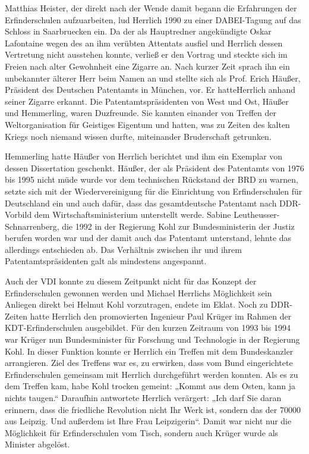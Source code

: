 \documentclass[11pt,a4paper]{article}
\begin{document}
Matthias Heister, der direkt nach der Wende damit begann die Erfahrungen der
Erfinderschulen aufzuarbeiten, lud Herrlich 1990 zu einer DABEI-Tagung auf das
Schloss in Saarbruecken ein. Da der als Hauptredner angekündigte Oskar
Lafontaine wegen des an ihm verübten Attentats ausfiel und Herrlich dessen
Vertretung nicht ausstehen konnte, verließ er den Vortrag und steckte sich im
Freien nach alter Gewohnheit eine Zigarre an.  Nach kurzer Zeit sprach ihn ein
unbekannter älterer Herr beim Namen an und stellte sich als Prof. Erich
Häußer, Präsident des Deutschen Patentamts in München, vor. Er hatteHerrlich
anhand seiner Zigarre erkannt. Die Patentamtspräsidenten von West und Ost,
Häußer und Hemmerling, waren Duzfreunde. Sie kannten einander von Treffen der
Weltorganisation für Geistiges Eigentum und hatten, was zu Zeiten des kalten
Kriegs noch niemand wissen durfte, miteinander Bruderschaft getrunken.

Hemmerling hatte Häußer von Herrlich berichtet und ihm ein Exemplar von dessen
Dissertation geschenkt. Häußer, der als Präsident des Patentamts von 1976 bis
1995 nicht müde wurde vor dem technischen Rückstand der BRD zu warnen, setzte
sich mit der Wiedervereinigung für die Einrichtung von Erfinderschulen für
Deutschland ein und auch dafür, dass das gesamtdeutsche Patentamt nach
DDR-Vorbild dem Wirtschaftsministerium unterstellt werde. Sabine
Leutheusser-Schnarrenberg, die 1992 in der Regierung Kohl zur Bundesministerin
der Justiz berufen worden war und der damit auch das Patentamt unterstand,
lehnte das allerdings entschieden ab. Das Verhältnis zwischen ihr und ihrem
Patentamtspräsidenten galt als mindestens angespannt.

Auch der VDI konnte zu diesem Zeitpunkt nicht für das Konzept der
Erfinderschulen gewonnen werden und Michael Herrlichs Möglichkeit sein
Anliegen direkt bei Helmut Kohl vorzutragen, endete im Eklat. Noch zu
DDR-Zeiten hatte Herrlich den promovierten Ingenieur Paul Krüger im Rahmen der
KDT-Erfinderschulen ausgebildet. Für den kurzen Zeitraum von 1993 bis 1994 war
Krüger nun Bundesminister für Forschung und Technologie in der Regierung
Kohl. In dieser Funktion konnte er Herrlich ein Treffen mit dem Bundeskanzler
arrangieren. Ziel des Treffens war es, zu erwirken, dass vom Bund
eingerichtete Erfinderschulen gemeinsam mit Herrlich durchgeführt werden
konnten. Als es zu dem Treffen kam, habe Kohl trocken gemeint: „Kommt aus dem
Osten, kann ja nichts taugen.“ Daraufhin antwortete Herrlich verärgert: „Ich
darf Sie daran erinnern, dass die friedliche Revolution nicht Ihr Werk ist,
sondern das der 70000 aus Leipzig. Und außerdem ist Ihre Frau
Leipzigerin“. Damit war nicht nur die Möglichkeit für Erfinderschulen vom
Tisch, sondern auch Krüger wurde als Minister abgelöst.
\end{document}
